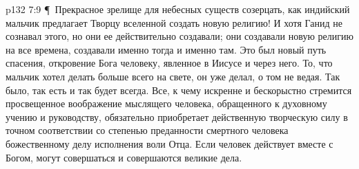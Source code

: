 \vs p132 7:9 \P\ Прекрасное зрелище для небесных существ созерцать, как индийский мальчик предлагает Творцу вселенной создать новую религию! И хотя Ганид не сознавал этого, но они ее действительно создавали; они создавали новую религию на все времена, создавали именно тогда и именно там. Это был новый путь спасения, откровение Бога человеку, явленное в Иисусе и через него. То, что мальчик хотел делать больше всего на свете, он уже делал, о том не ведая. Так было, так есть и так будет всегда. Все, к чему искренне и бескорыстно стремится просвещенное воображение мыслящего человека, обращенного к духовному учению и руководству, обязательно приобретает действенную творческую силу в точном соответствии со степенью преданности смертного человека божественному делу исполнения воли Отца. Если человек действует вместе с Богом, могут совершаться и совершаются великие дела.
